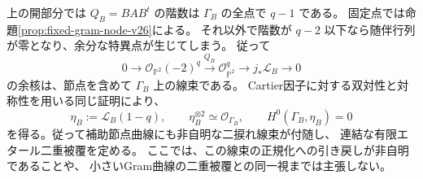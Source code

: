 \begin{remark}[補助曲線の対称行列表示も線束を定める]
\label{rem:complementary-nodal-prym-v26}
上の開部分では $Q_B=BAB^t$ の階数は $\Gamma_B$ の全点で $q-1$ である。
固定点では命題\ref{prop:fixed-gram-node-v26}による。
それ以外で階数が $q-2$ 以下なら随伴行列が零となり、余分な特異点が生じてしまう。
従って
\[
 0\longrightarrow\mathcal O_{\mathbb P^2}(-2)^q
 \xrightarrow{Q_B}\mathcal O_{\mathbb P^2}^q
 \longrightarrow j_*\mathcal L_B\longrightarrow0
\]
の余核は、節点を含めて $\Gamma_B$ 上の線束である。
Cartier因子に対する双対性と対称性を用いる同じ証明により、
\[
 \eta_B:=\mathcal L_B(1-q),\qquad
 \eta_B^{\otimes2}\simeq\mathcal O_{\Gamma_B},\qquad
 H^0(\Gamma_B,\eta_B)=0
\]
を得る。従って補助節点曲線にも非自明な二捩れ線束が付随し、
連結な有限エタール二重被覆を定める。
ここでは、この線束の正規化への引き戻しが非自明であることや、
小さいGram曲線の二重被覆との同一視までは主張しない。
\end{remark}
